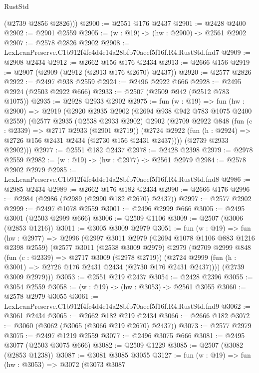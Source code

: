 \begin{lexlean}{RustStd}
\begin{coremodule}
        (@2739 @2856 @2826)))
@2900 := @2551 @176 @2437
@2901 := @2428 @2400
@2902 := @2901 @2559
@2905 := (w : @19) -> (hw : @2900) -> @2561 @2902
@2907 := @2578 @2826 @2902
@2908 := LexLeanPreserve.C1b912f4fc4d4e14a28bfb70aeef5f16f.R4.RustStd.fnd7
@2909 := @2908 @2434
@2912 := @2662 @156 @176 @2434
@2913 := @2666 @156
@2919 := @2907 (@2909 (@2912 (@2913 @176 @2670) @2437))
@2920 := @2577 @2826
@2922 := @2497 @938 @2559
@2924 := @2496 @2922 @666
@2928 := @2495 @2924 (@2503 @2922 @666)
@2933 := @2507 (@2509 @942 (@2512 @783 @1075))
@2935 := @2928 @2933 @2902
@2975 := fun (w : @19) =>
  fun (hw : @2900) =>
  @2919
    (@2920
      @2935
      @2902
      (@2694 @938 @942 @783 @1075 @2400 @2559)
      (@2577
        @2935
        (@2538 @2933 @2902)
        @2902
        (@2709
          @2922
          @848
          (fun (c : @2339) => @2717 @2933 (@2901 @2719))
          (@2724 @2922 (fun (h : @2924) => @2726 @156 @2431 @2434 (@2730 @156 @2431 @2437))))
        (@2739 @2933 @2902)))
@2977 := @2551 @182 @2437
@2978 := @2428 @2398
@2979 := @2978 @2559
@2982 := (w : @19) -> (hw : @2977) -> @2561 @2979
@2984 := @2578 @2902 @2979
@2985 := LexLeanPreserve.C1b912f4fc4d4e14a28bfb70aeef5f16f.R4.RustStd.fnd8
@2986 := @2985 @2434
@2989 := @2662 @176 @182 @2434
@2990 := @2666 @176
@2996 := @2984 (@2986 (@2989 (@2990 @182 @2670) @2437))
@2997 := @2577 @2902
@2999 := @2497 @1078 @2559
@3001 := @2496 @2999 @666
@3005 := @2495 @3001 (@2503 @2999 @666)
@3006 := @2509 @1106
@3009 := @2507 (@3006 (@2853 @1216))
@3011 := @3005 @3009 @2979
@3051 := fun (w : @19) =>
  fun (hw : @2977) =>
  @2996
    (@2997
      @3011
      @2979
      (@2694 @1078 @1106 @883 @1216 @2398 @2559)
      (@2577
        @3011
        (@2538 @3009 @2979)
        @2979
        (@2709
          @2999
          @848
          (fun (c : @2339) => @2717 @3009 (@2978 @2719))
          (@2724 @2999 (fun (h : @3001) => @2726 @176 @2431 @2434 (@2730 @176 @2431 @2437))))
        (@2739 @3009 @2979)))
@3053 := @2551 @219 @2437
@3054 := @2428 @2396
@3055 := @3054 @2559
@3058 := (w : @19) -> (hw : @3053) -> @2561 @3055
@3060 := @2578 @2979 @3055
@3061 := LexLeanPreserve.C1b912f4fc4d4e14a28bfb70aeef5f16f.R4.RustStd.fnd9
@3062 := @3061 @2434
@3065 := @2662 @182 @219 @2434
@3066 := @2666 @182
@3072 := @3060 (@3062 (@3065 (@3066 @219 @2670) @2437))
@3073 := @2577 @2979
@3075 := @2497 @1219 @2559
@3077 := @2496 @3075 @666
@3081 := @2495 @3077 (@2503 @3075 @666)
@3082 := @2509 @1229
@3085 := @2507 (@3082 (@2853 @1238))
@3087 := @3081 @3085 @3055
@3127 := fun (w : @19) =>
  fun (hw : @3053) =>
  @3072
    (@3073
      @3087

\end{coremodule}
\end{lexlean}
